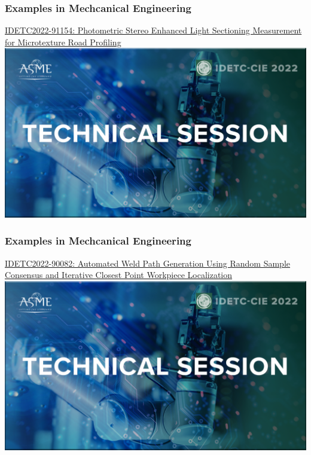 \documentclass[fleqn]{beamer} %
\newcommand{\sectionIsubsectionIVtitle}{Examples in Mechcanical Engineering}
\begin{document}
			\begin{frame}
				\frametitle{\sectionIsubsectionIVtitle}

				\href{https://events-platform.asmeconferences.org/event/idetc-cie-2022/planning/UGxhbm5pbmdfOTcxMzIx}{IDETC2022-91154: Photometric Stereo Enhanced Light Sectioning Measurement for Microtexture Road Profiling}\vspace{5mm}\\

				\includegraphics[scale=0.125]{images/IDETC_technical_session.png}
			 
			\end{frame}

			\begin{frame}
				\frametitle{\sectionIsubsectionIVtitle}
				\href{https://events-platform.asmeconferences.org/event/idetc-cie-2022/planning/UGxhbm5pbmdfOTcxNDk4}{IDETC2022-90082: Automated Weld Path Generation Using Random Sample Consensus and Iterative Closest Point Workpiece Localization}\vspace{5mm}\\

				\includegraphics[scale=0.125]{images/IDETC_technical_session.png}

			\end{frame}	
\end{document}
